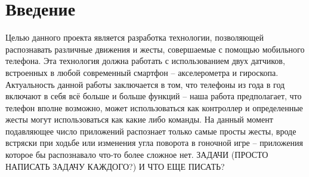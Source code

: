 \section{Введение}

Целью данного проекта является разработка технологии, позволяющей распознавать различные движения и жесты, совершаемые с помощью мобильного телефона. Эта технология должна работать с использованием двух датчиков, встроенных в любой современный смартфон – акселерометра и гироскопа.
Актуальность данной работы заключается в том, что телефоны из года в год включают в себя всё больше и больше функций – наша работа предполагает, что телефон вполне возможно, может использоваться как контроллер и определенные жесты могут использоваться как какие либо команды.
На данный момент подавляющее число приложений распознает только самые просты жесты, вроде встряски при ходьбе или изменения угла поворота в гоночной игре – приложения которое бы распознавало что-то более сложное нет.
ЗАДАЧИ (ПРОСТО НАПИСАТЬ ЗАДАЧУ КАЖДОГО?) И ЧТО ЕЩЕ ПИСАТЬ?